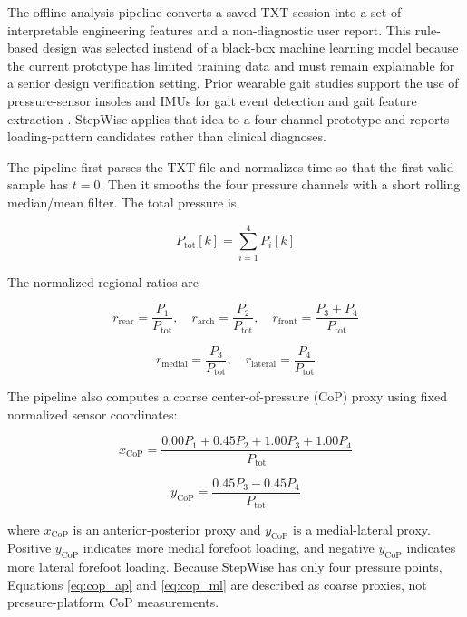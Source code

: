 The offline analysis pipeline converts a saved TXT session into a set of interpretable engineering features and a non-diagnostic user report. This rule-based design was selected instead of a black-box machine learning model because the current prototype has limited training data and must remain explainable for a senior design verification setting. Prior wearable gait studies support the use of pressure-sensor insoles and IMUs for gait event detection and gait feature extraction \cite{ngueleu_insole,muro_gait_wearable}. StepWise applies that idea to a four-channel prototype and reports loading-pattern candidates rather than clinical diagnoses.

The pipeline first parses the TXT file and normalizes time so that the first valid sample has $t=0$. Then it smooths the four pressure channels with a short rolling median/mean filter. The total pressure is

\begin{equation}
P_{\mathrm{tot}}[k] = \sum_{i=1}^{4} P_i[k]
\label{eq:total_pressure}
\end{equation}

The normalized regional ratios are

\begin{equation}
r_{\mathrm{rear}} = \frac{P_1}{P_{\mathrm{tot}}}, \quad
r_{\mathrm{arch}} = \frac{P_2}{P_{\mathrm{tot}}}, \quad
r_{\mathrm{front}} = \frac{P_3+P_4}{P_{\mathrm{tot}}}
\label{eq:regional_ratios}
\end{equation}

\begin{equation}
r_{\mathrm{medial}} = \frac{P_3}{P_{\mathrm{tot}}}, \quad
r_{\mathrm{lateral}} = \frac{P_4}{P_{\mathrm{tot}}}
\label{eq:ml_ratios}
\end{equation}

The pipeline also computes a coarse center-of-pressure (CoP) proxy using fixed normalized sensor coordinates:

\begin{equation}
x_{\mathrm{CoP}} =
\frac{0.00P_1 + 0.45P_2 + 1.00P_3 + 1.00P_4}{P_{\mathrm{tot}}}
\label{eq:cop_ap}
\end{equation}

\begin{equation}
y_{\mathrm{CoP}} =
\frac{0.45P_3 - 0.45P_4}{P_{\mathrm{tot}}}
\label{eq:cop_ml}
\end{equation}

where $x_{\mathrm{CoP}}$ is an anterior-posterior proxy and $y_{\mathrm{CoP}}$ is a medial-lateral proxy. Positive $y_{\mathrm{CoP}}$ indicates more medial forefoot loading, and negative $y_{\mathrm{CoP}}$ indicates more lateral forefoot loading. Because StepWise has only four pressure points, Equations \eqref{eq:cop_ap} and \eqref{eq:cop_ml} are described as coarse proxies, not pressure-platform CoP measurements.

